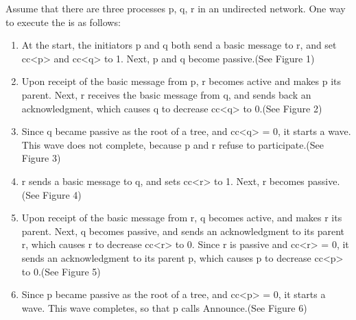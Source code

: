 \documentclass[letterpaper,10pt,english]{sphinxmanual}
\begin{document}
\sphinxAtStartPar
Assume that there are three processes p, q, r in an undirected network. One way to execute the {\hyperref[\detokenize{docs/ShavitFrancezAlg/algorithm:shavitfranchesterminationdetectionalgorithm}]{}} is as follows:
\begin{enumerate}
%
\item {} 
\sphinxAtStartPar
At the start, the initiators p and q both send a basic message to r, and set cc\textless{}p\textgreater{} and cc\textless{}q\textgreater{} to 1. Next, p and q become passive.(See Figure 1)

\item {} 
\sphinxAtStartPar
Upon receipt of the basic message from p, r becomes active and makes p its parent. Next, r receives the basic message from q, and sends back an acknowledgment, which causes q to decrease cc\textless{}q\textgreater{} to 0.(See Figure 2)

\item {} 
\sphinxAtStartPar
Since q became passive as the root of a tree, and cc\textless{}q\textgreater{} = 0, it starts a wave. This wave does not complete, because p and r refuse to participate.(See Figure 3)

\item {} 
\sphinxAtStartPar
r sends a basic message to q, and sets cc\textless{}r\textgreater{} to 1. Next, r becomes passive.(See Figure 4)

\item {} 
\sphinxAtStartPar
Upon receipt of the basic message from r, q becomes active, and makes r its parent. Next, q becomes passive, and sends an acknowledgment to its parent r, which causes r to decrease cc\textless{}r\textgreater{} to 0. Since r is passive and cc\textless{}r\textgreater{} = 0, it sends an acknowledgment to its parent p, which causes p to decrease cc\textless{}p\textgreater{} to 0.(See Figure 5)

\item {} 
\sphinxAtStartPar
Since p became passive as the root of a tree, and cc\textless{}p\textgreater{} = 0, it starts a wave. This wave completes, so that p calls Announce.(See Figure 6)

\end{enumerate}
\end{document}
